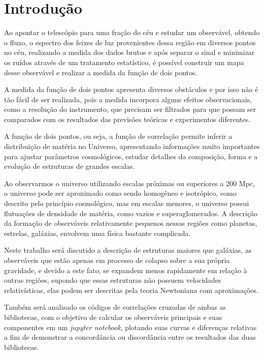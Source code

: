 	\chapter*{Introdução}

 Ao apontar o telescópio para uma fração do céu e estudar um observável, obtendo o fluxo, o espectro dos feixes de luz provenientes dessa região em diversos pontos no céu, realizando a medida dos dados brutos e após separar o sinal e minimizar os ruídos através de um tratamento estatístico, é possível construir um mapa desse observável e realizar a medida da função de dois pontos.
 
A medida da função de dois pontos apresenta diversos obstáculos e por isso não é tão fácil de ser realizada, pois a medida incorpora alguns efeitos observacionais, como a resolução do instrumento, que precisam ser filtrados para que possam ser comparados com os resultados das previsões teóricas e experimentos diferentes. 

A função de dois pontos, ou seja, a função de correlação permite inferir a distribuição de matéria no Universo, apresentando informações muito importantes para ajustar parâmetros cosmológicos, estudar detalhes da composição, forma e a evolução de estruturas de grandes escalas.

Ao observarmos o universo utilizando escalas próximas ou superiores a 200 Mpc, o universo pode ser aproximado como sendo homogêneo e isotrópico, como descrito pelo princípio cosmológico, mas em escalas menores, o universo possui flutuações de densidade de matéria, como vazios e superaglomerados. A descrição da formação de observáveis relativamente pequenos nessas regiões como planetas, estrelas, galáxias, envolvem uma física bastante complicada.

Neste trabalho será discutido a descrição de estruturas maiores que galáxias, as observáveis que estão apenas em processo de colapso sobre a sua própria gravidade, e devido a este fato, se expandem menos rapidamente em relação à outras regiões, supondo que essas estruturas não possuem velocidades relativísticas, elas podem ser descritas pela teoria Newtoniana com aproximações.

Também será analisado os códigos de correlações cruzadas de ambas as bibliotecas, com  o objetivo de calcular os observáveis principais e suas componentes em um \textit{jupyter notebook}, plotando suas curvas e diferenças relativas a fim de demonstrar a concordância ou discordância entre os resultados das duas bibliotecas.





		